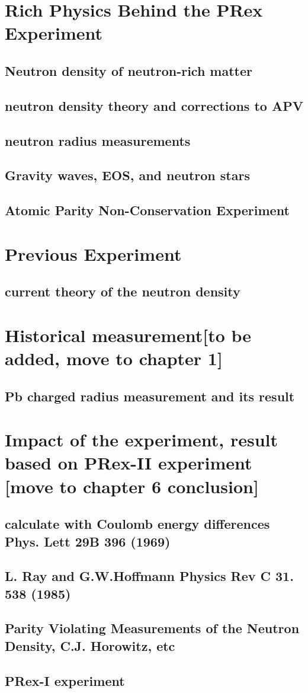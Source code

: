 \section{Rich Physics Behind the PRex Experiment}
\subsection{Neutron density of neutron-rich matter}
\subsection{neutron density theory and corrections to APV}
\subsection{neutron radius measurements}
\subsection{Gravity waves, EOS, and neutron stars}
\subsection{Atomic Parity Non-Conservation Experiment}

\section{Previous Experiment}
\subsection{current theory of the neutron density}

\section{Historical measurement[to be added, move to chapter 1]}
\subsection{Pb charged radius measurement and its result }

\section{Impact of the experiment, result based on PRex-II experiment [move to chapter 6 conclusion]}

\subsection{calculate with Coulomb energy differences Phys. Lett 29B 396 (1969)}
\subsection{L. Ray and G.W.Hoffmann Physics Rev C 31. 538 (1985)}
\subsection{ Parity Violating Measurements of the Neutron Density, C.J. Horowitz, etc}
\subsection{PRex-I experiment}